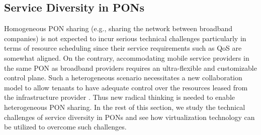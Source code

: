 
\subsection{Service Diversity in \acp{PON}}

Homogeneous \ac{PON} sharing (e.g., sharing the network between broadband companies) is not expected to incur serious technical challenges particularly in terms of resource scheduling since their service requirements such as \ac{QoS} are somewhat aligned. %
On the contrary, accommodating mobile service providers in the same \ac{PON} as broadband providers requires an ultra-flexible and customizable control plane. Such a heterogeneous scenario necessitates a new collaboration model to allow tenants to have adequate control over the resources leased from the infrastructure provider \cite{Cornaglia20152}. Thus new radical thinking is needed to enable heterogeneous \ac{PON} sharing. In the rest of this section, we study the technical challenges of service diversity in \acp{PON} and see how virtualization technology can be utilized to overcome such challenges.

